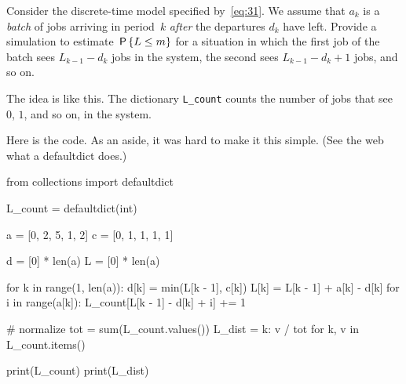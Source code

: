 \documentclass[queueing-book.tex]{subfiles}
\begin{document}
\begin{exercise}\label{ex:l-166}
Consider 
 the discrete-time model specified by~\cref{eq:31}. We assume that $a_{k}$ is a \emph{batch} of jobs arriving in period~$k$ \emph{after} the departures $d_k$ have left.
Provide a simulation to estimate  $\,\mathsf{P}\left\{L\leq m\right\}$ for a situation in which  the first job of the batch sees $L_{k-1} - d_k$ jobs in the system,
the second sees $L_{k-1}-d_k + 1$ jobs, and so on.
\begin{solution}
The idea is like this. The dictionary \texttt{L_count} counts the number of jobs that see~$0$, $1$, and so on, in the system.

Here is the code. As an aside, it was hard to make it this simple. (See  the web what a defaultdict does.)
\begin{python}
from collections import defaultdict

L_count = defaultdict(int)

a = [0, 2, 5, 1, 2]
c = [0, 1, 1, 1, 1]

d = [0] * len(a)
L = [0] * len(a)

for k in range(1, len(a)):
    d[k] = min(L[k - 1], c[k])
    L[k] = L[k - 1] + a[k] - d[k]
    for i in range(a[k]):
        L_count[L[k - 1] - d[k] + i] += 1


# normalize
tot = sum(L_count.values())
L_dist = {k: v / tot for k, v in L_count.items()}

print(L_count)
print(L_dist)
\end{python}

\end{solution}
\end{exercise}



\end{document}
